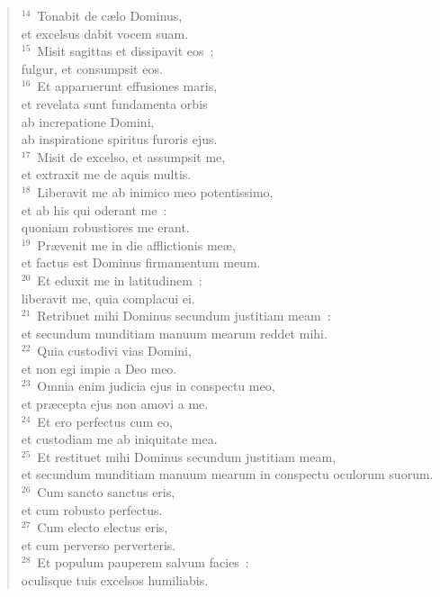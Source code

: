 \begin{flushleft}
\begin{verse}
${}^{14}$~Tonabit de c\ae lo Dominus,\\ et excelsus dabit vocem suam.\\
${}^{15}$~Misit sagittas et dissipavit eos~;\\ fulgur, et consumpsit eos.\\
${}^{16}$~Et apparuerunt effusiones maris,\\ et revelata sunt fundamenta orbis\\ ab increpatione Domini,\\ ab inspiratione spiritus furoris ejus.\\
${}^{17}$~Misit de excelso, et assumpsit me,\\ et extraxit me de aquis multis.\\
${}^{18}$~Liberavit me ab inimico meo potentissimo,\\ et ab his qui oderant me~:\\ quoniam robustiores me erant.\\
${}^{19}$~Pr\ae venit me in die afflictionis me\ae ,\\ et factus est Dominus firmamentum meum.\\
${}^{20}$~Et eduxit me in latitudinem~:\\ liberavit me, quia complacui ei.\\
${}^{21}$~Retribuet mihi Dominus secundum justitiam meam~:\\ et secundum munditiam manuum mearum reddet mihi.\\
${}^{22}$~Quia custodivi vias Domini,\\ et non egi impie a Deo meo.\\
${}^{23}$~Omnia enim judicia ejus in conspectu meo,\\ et pr\ae cepta ejus non amovi a me.\\
${}^{24}$~Et ero perfectus cum eo,\\ et custodiam me ab iniquitate mea.\\
${}^{25}$~Et restituet mihi Dominus secundum justitiam meam,\\ et secundum munditiam manuum mearum in conspectu oculorum suorum.\\
${}^{26}$~Cum sancto sanctus eris,\\ et cum robusto perfectus.\\
${}^{27}$~Cum electo electus eris,\\ et cum perverso perverteris.\\
${}^{28}$~Et populum pauperem salvum facies~:\\ oculisque tuis excelsos humiliabis.\\

\end{verse}
\end{flushleft}
